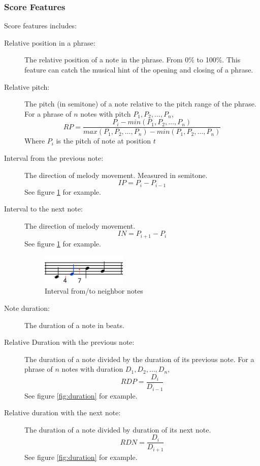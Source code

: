       \subsubsection{Score Features}
      Score features includes:
      \begin{description}
         \item [Relative position in a phrase:]
            The relative position of a note in the phrase. From 0\% to 100\%. This feature can catch the musical hint of the opening and closing of a phrase.  
         \item [Relative pitch:]
            The pitch (in semitone) of a note relative to the pitch range of the phrase. For a phrase of $n$ notes with pitch $P_1, P_2, \dots, P_n$, $$RP = \frac{P_i -min(P_1, P_2, \dots, P_n) }{max(P_1, P_2, \dots, P_n)-min(P_1, P_2, \dots, P_n) }$$  Where $P_i$ is the pitch of note at position $t$

         \item [Interval from the previous note:] The direction of melody movement. Measured in semitone. $$IP = P_{i} - P_{i-1} $$ See figure \ref{fig:interval} for example.
         \item [Interval to the next note:] The direction of melody movement. $$IN = P_{i+1} - P_i$$ See figure \ref{fig:interval} for example.
         
      \begin{figure}[htbp]
         \begin{center}
            \includegraphics[width=0.4\textwidth]{fig/interval_arrow}
         \end{center}
         \caption{Interval from/to neighbor notes}
         \label{fig:interval}
      \end{figure}

         
         \item [Note duration:] The duration of a note in beats.
         \item [Relative Duration with the previous note:] The duration of a note divided by the duration of its previous note. For a phrase of $n$ notes with duration $D_1, D_2, \dots, D_n$, $$RDP = \frac{D_i}{D_{i-1}} $$ See figure \ref{fig:duration} for example.
         \item [Relative duration with the next note:] The duration of a note divided by duration of its next note. $$RDN = \frac{D_i}{D_{i+1}} $$ See figure \ref{fig:duration} for example.


\end{description}

